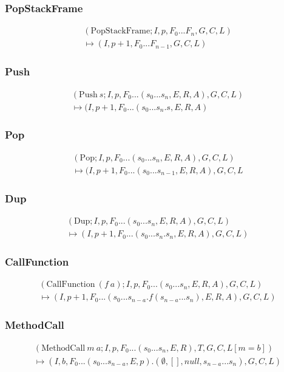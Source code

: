 \subsubsection{PopStackFrame}
\begin{multline}
(\text{PopStackFrame}; I, p, F_0...F_n, G, C, L) \\ \mapsto (I, p+1, F_0...F_{n-1}, G, C, L)
\end{multline}
\subsubsection{Push}

\begin{multline}
(\text{Push}\ s; I, p, F_0...(s_0...s_n, E, R, A), G, C, L) \\ \mapsto (I, p+1, F_0...(s_0...s_n.s, E, R, A)
\end{multline}

\subsubsection{Pop}
\begin{multline}
(\text{Pop}; I, p, F_0...(s_0...s_n, E, R, A), G, C, L) \\ \mapsto (I, p+1, F_0...(s_0...s_{n-1}, E, R,  A), G, C, L
\end{multline}
\subsubsection{Dup}
\begin{multline}
(\text{Dup}; I, p, F_0...(s_0...s_n, E, R, A), G, C, L) \\ \mapsto (I, p+1, F_0...(s_0...s_n.s_n, E, R, A), G, C, L)
\end{multline}
\subsubsection{CallFunction}
\begin{multline}
(\text{CallFunction}\ (f\ a); I, p, F_0...(s_0...s_n, E, R, A), G, C, L) \\ \mapsto (I, p+1, F_0...(s_0...s_{n-a}.f(s_{n-a}...s_n), E, R, A), G, C, L)
\end{multline}
\subsubsection{MethodCall}
\begin{multline}
(\text{MethodCall}\ m \ a; I, p, F_0...(s_0...s_n, E, R), T, G, C, L[m=b]) \\ \mapsto (I, b, F_0...(s_0...s_{n-a}, E, p).(\emptyset, [], null, s_{n-a}...s_n), G, C, L)
\end{multline}
